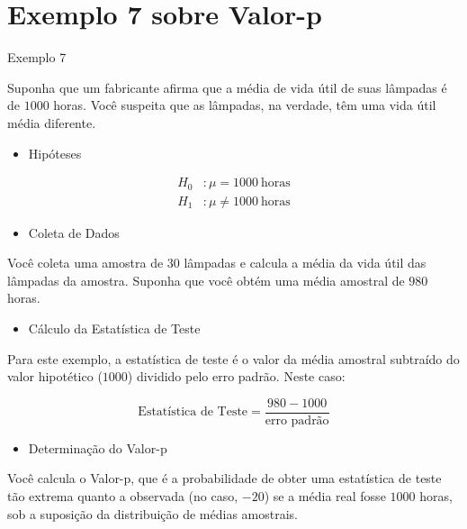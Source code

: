 \documentclass[12pt]{beamer}
\begin{document}
\section{Exemplo 7 sobre Valor-p}
\begin{frame}{Exemplo 7}
\begin{block}{}
\justifying

Suponha que um fabricante afirma que a média de vida útil de suas lâmpadas é de $1000$ horas. Você suspeita que as lâmpadas, na verdade, têm uma vida útil média diferente.

\begin{itemize}
    \item Hipóteses
\end{itemize}

\begin{align*}
H_0 &: \mu = 1000~\text{horas} \\
H_1 &: \mu \neq 1000~\text{horas}
\end{align*}
\pause
\begin{itemize}
    \item Coleta de Dados
\end{itemize}

Você coleta uma amostra de $30$ lâmpadas e calcula a média da vida útil das lâmpadas da amostra. Suponha que você obtém uma média amostral de $980$ horas.

\end{block}
\end{frame}

\begin{frame}{}
\begin{block}{}
\justifying
\begin{itemize}
    \item Cálculo da Estatística de Teste
\end{itemize}

Para este exemplo, a estatística de teste é o valor da média amostral subtraído do valor hipotético ($1000$) dividido pelo erro padrão. Neste caso:

\[
\text{Estatística de Teste} = \dfrac{980 - 1000}{\text{erro padrão}}
\]
\pause
\begin{itemize}
    \item Determinação do Valor-p
\end{itemize}


Você calcula o Valor-p, que é a probabilidade de obter uma estatística de teste tão extrema quanto a observada (no caso, $-20$) se a média real fosse $1000$ horas, sob a suposição da distribuição de médias amostrais.

\end{block}
\end{frame}
\end{document}
